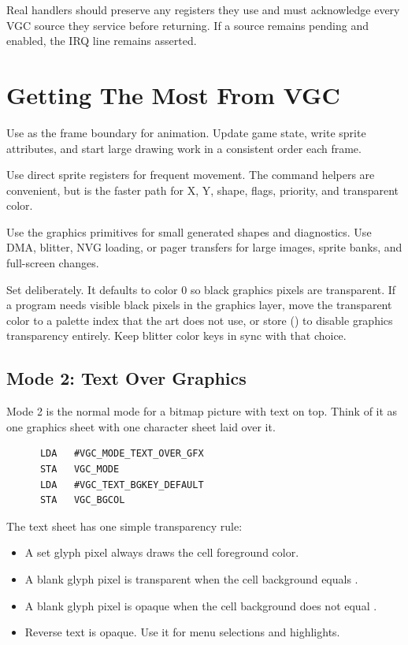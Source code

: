 Real handlers should preserve any registers they use and must acknowledge every
VGC source they service before returning. If a source remains pending and
enabled, the IRQ line remains asserted.

\section{Getting The Most From VGC}

Use  as the frame boundary for animation. Update game
state, write sprite attributes, and start large drawing work in a consistent
order each frame.

Use direct sprite registers for frequent movement. The command helpers are
convenient, but  is the faster path for X, Y,
shape, flags, priority, and transparent color.

Use the graphics primitives for small generated shapes and diagnostics. Use
DMA, blitter, NVG loading, or pager transfers for large images, sprite banks,
and full-screen changes.

Set  deliberately. It defaults to color 0 so black
graphics pixels are transparent. If a program needs visible black pixels in the
graphics layer, move the transparent color to a palette index that the art does
not use, or store  () to disable
graphics transparency entirely. Keep blitter color keys in sync with that choice.

\subsection{Mode 2: Text Over Graphics}

Mode 2 is the normal mode for a bitmap picture with text on top. Think of it as
one graphics sheet with one character sheet laid over it.

\begin{lstlisting}
      LDA   #VGC_MODE_TEXT_OVER_GFX
      STA   VGC_MODE
      LDA   #VGC_TEXT_BGKEY_DEFAULT
      STA   VGC_BGCOL
\end{lstlisting}

The text sheet has one simple transparency rule:

\begin{itemize}
\item A set glyph pixel always draws the cell foreground color.
\item A blank glyph pixel is transparent when the cell background equals
      .
\item A blank glyph pixel is opaque when the cell background does not equal
      .
\item Reverse text is opaque. Use it for menu selections and highlights.
\end{itemize}

